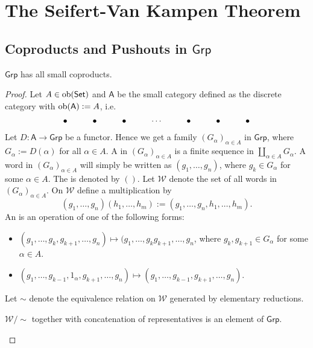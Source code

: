 \section*{The Seifert-Van Kampen Theorem}
\subsection*{Coproducts and Pushouts in $\mathsf{Grp}$}

\begin{proposition}
	$\mathsf{Grp}$ has all small coproducts.
\end{proposition}

\begin{proof}
	Let $A \in \operatorname{ob}(\mathsf{Set})$ and $\mathsf{A}$ be the small category defined as the discrete category with $\operatorname{ob}(\mathsf{A}) := A$, i.e.
	\begin{equation*}
		\xymatrix{
			\bullet & \bullet & \bullet & \cdots & \bullet & \bullet & \bullet
		}
	\end{equation*}	
	Let $D : \mathsf{A} \to \mathsf{Grp}$ be a functor. Hence we get a family $(G_\alpha)_{\alpha \in A}$ in $\mathsf{Grp}$, where $G_\alpha := D(\alpha)$ for all $\alpha \in A$. A  in $(G_\alpha)_{\alpha \in A}$ is a finite sequence in $\coprod_{\alpha \in A}G_\alpha$. A word in $(G_\alpha)_{\alpha \in A}$ will simply be written as $(g_1,\dots, g_n)$, where $g_k \in G_\alpha$ for some $\alpha \in A$. The  is denoted by $()$. Let $\mathcal{W}$ denote the set of all words in $(G_\alpha)_{\alpha \in A}$. On $\mathcal{W}$ define a multiplication by 
	\begin{equation*}
		(g_1,\dots, g_n)(h_1,\dots, h_m) := (g_1, \dots, g_n,h_1, \dots, h_m).
	\end{equation*}
	An  is an operation of one of the following forms:
	\begin{itemize}[leftmargin = *]
		\item $(g_1, \dots ,g_k,g_{k + 1}, \dots, g_n) \mapsto (g_1,\dots,g_kg_{k + 1},\dots,g_n $, where $g_k,g_{k + 1} \in G_\alpha$ for some $\alpha \in A$.
		\item $(g_1,\dots,g_{k - 1},1_\alpha,g_{k + 1},\dots,g_n) \mapsto (g_1,\dots,g_{k - 1},g_{k + 1},\dots,g_n)$.
	\end{itemize}
	Let $\sim$ denote the equivalence relation on $\mathcal{W}$ generated by elementary reductions. 
	
	\begin{lemma}
		$\mathcal{W}/{\sim}$ together with concatenation of representatives is an element of $\mathsf{Grp}$.
		\label{lem:free_product}
	\end{lemma}


\end{proof}
